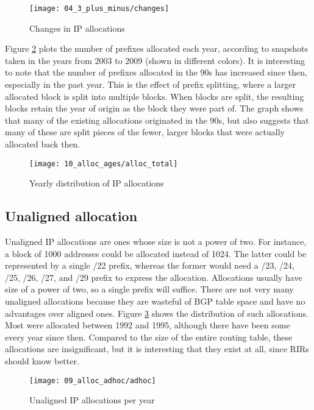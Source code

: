 \begin{figure}[htbp]
    \centering
        \texttt{[image: 04\_3\_plus\_minus/changes]}
    \caption{Changes in IP allocations}
    \label{fig:IP allocations new and gone}
\end{figure}

Figure \ref{fig:alloc ages total} plots the number of prefixes allocated each year, according to snapshots taken in the years from 2003 to 2009 (shown in different colors). It is interesting to note that the number of prefixes allocated in the 90s has increased since then, especially in the past year. This is the effect of prefix splitting, where a larger allocated block is split into multiple blocks. When blocks are split, the resulting blocks retain the year of origin as the block they were part of. The graph shows that many of the existing allocations originated in the 90s, but also suggests that many of these are split pieces of the fewer, larger blocks that were actually allocated back then.

\begin{figure}[htbp]
	\centering
		\texttt{[image: 10\_alloc\_ages/alloc\_total]}
	\caption{Yearly distribution of IP allocations}
	\label{fig:alloc ages total}
\end{figure}

\subsection{Unaligned allocation}

Unaligned IP allocations are ones whose size
is not a power of two. For instance, a block of 1000 addresses could be
allocated instead of 1024. The latter could be represented by a single /22
prefix, whereas the former would need a /23, /24, /25, /26, /27, and /29
prefix to express the allocation. Allocations usually have size of a power of
two, so a single prefix will suffice. There are not very many unaligned
allocations because they are wasteful of BGP table space and have no
advantages over aligned ones. Figure \ref{fig:unaligned IP allocations} shows
the distribution of such allocations. Most were allocated between 1992 and
1995, although there have been some every year since then. Compared to the
size of the entire routing table, these allocations are insignificant, but it
is interesting that they exist at all, since RIRs should know better.

\begin{figure}[htbp]
 	\centering
 		\texttt{[image: 09\_alloc\_adhoc/adhoc]}
	\caption{Unaligned IP allocations per year}
 	\label{fig:unaligned IP allocations}
\end{figure}
